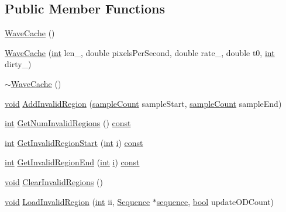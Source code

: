 \subsection*{Public Member Functions}
\begin{DoxyCompactItemize}
\item 
\hyperlink{class_wave_cache_aba53f54a630a51cb7ca4a0317b92a198}{Wave\+Cache} ()
\item 
\hyperlink{class_wave_cache_a05c70a2533ce17e68409d8d9e8f90680}{Wave\+Cache} (\hyperlink{xmltok_8h_a5a0d4a5641ce434f1d23533f2b2e6653}{int} len\+\_\+, double pixels\+Per\+Second, double rate\+\_\+, double t0, \hyperlink{xmltok_8h_a5a0d4a5641ce434f1d23533f2b2e6653}{int} dirty\+\_\+)
\item 
\hyperlink{class_wave_cache_a15bfa204fd1eb87f35a135f5213d4470}{$\sim$\+Wave\+Cache} ()
\item 
\hyperlink{sound_8c_ae35f5844602719cf66324f4de2a658b3}{void} \hyperlink{class_wave_cache_a2b2bdd8928cf67f0465ed30f65165dc8}{Add\+Invalid\+Region} (\hyperlink{include_2audacity_2_types_8h_afa427e1f521ea5ec12d054e8bd4d0f71}{sample\+Count} sample\+Start, \hyperlink{include_2audacity_2_types_8h_afa427e1f521ea5ec12d054e8bd4d0f71}{sample\+Count} sample\+End)
\item 
\hyperlink{xmltok_8h_a5a0d4a5641ce434f1d23533f2b2e6653}{int} \hyperlink{class_wave_cache_a22695be150b4ea724ef03b963a9564a4}{Get\+Num\+Invalid\+Regions} () \hyperlink{getopt1_8c_a2c212835823e3c54a8ab6d95c652660e}{const} 
\item 
\hyperlink{xmltok_8h_a5a0d4a5641ce434f1d23533f2b2e6653}{int} \hyperlink{class_wave_cache_a56afddc16b7aee5251933c1ded20fe4a}{Get\+Invalid\+Region\+Start} (\hyperlink{xmltok_8h_a5a0d4a5641ce434f1d23533f2b2e6653}{int} \hyperlink{checksum_8c_ab80e330a3bc9e38c1297fe17381e92b4}{i}) \hyperlink{getopt1_8c_a2c212835823e3c54a8ab6d95c652660e}{const} 
\item 
\hyperlink{xmltok_8h_a5a0d4a5641ce434f1d23533f2b2e6653}{int} \hyperlink{class_wave_cache_a0aee9d581a904beee94706d3ab09c2f6}{Get\+Invalid\+Region\+End} (\hyperlink{xmltok_8h_a5a0d4a5641ce434f1d23533f2b2e6653}{int} \hyperlink{checksum_8c_ab80e330a3bc9e38c1297fe17381e92b4}{i}) \hyperlink{getopt1_8c_a2c212835823e3c54a8ab6d95c652660e}{const} 
\item 
\hyperlink{sound_8c_ae35f5844602719cf66324f4de2a658b3}{void} \hyperlink{class_wave_cache_a0590a24a1d9e626f4ce499f4e8f5dfa2}{Clear\+Invalid\+Regions} ()
\item 
\hyperlink{sound_8c_ae35f5844602719cf66324f4de2a658b3}{void} \hyperlink{class_wave_cache_ad38bea598de6136c9eeba97b95370130}{Load\+Invalid\+Region} (\hyperlink{xmltok_8h_a5a0d4a5641ce434f1d23533f2b2e6653}{int} ii, \hyperlink{class_sequence}{Sequence} $\ast$\hyperlink{seqmwrite_8c_aa85df2bb76931a50df646c42ac67b112}{sequence}, \hyperlink{mac_2config_2i386_2lib-src_2libsoxr_2soxr-config_8h_abb452686968e48b67397da5f97445f5b}{bool} update\+O\+D\+Count)

\end{DoxyCompactItemize}
